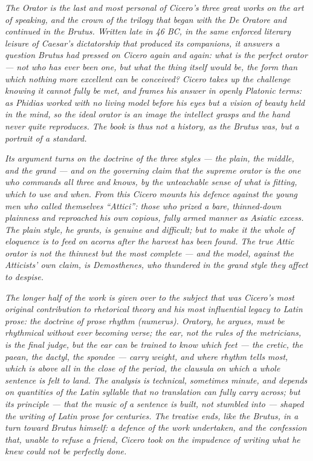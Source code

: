 
\textit{The \textit{Orator} is the last and most personal of
Cicero's three great works on the art of speaking, and the
crown of the trilogy that began with the \textit{De Oratore}
and continued in the \textit{Brutus}. Written late in 46 BC,
in the same enforced literary leisure of Caesar's dictatorship
that produced its companions, it answers a question Brutus had
pressed on Cicero again and again: what is the perfect orator
--- not who has ever been one, but what the thing itself would
be, the form than which nothing more excellent can be conceived?
Cicero takes up the challenge knowing it cannot fully be met,
and frames his answer in openly Platonic terms: as Phidias
worked with no living model before his eyes but a vision of
beauty held in the mind, so the ideal orator is an image the
intellect grasps and the hand never quite reproduces. The book
is thus not a history, as the \textit{Brutus} was, but a
portrait of a standard.}

\textit{Its argument turns on the doctrine of the three styles
--- the plain, the middle, and the grand --- and on the
governing claim that the supreme orator is the one who commands
all three and knows, by the unteachable sense of what is
fitting, which to use and when. From this Cicero mounts his
defence against the young men who called themselves
``Attici'': those who prized a bare, thinned-down plainness and
reproached his own copious, fully armed manner as Asiatic
excess. The plain style, he grants, is genuine and difficult;
but to make it the whole of eloquence is to feed on acorns
after the harvest has been found. The true Attic orator is not
the thinnest but the most complete --- and the model, against
the Atticists' own claim, is Demosthenes, who thundered in the
grand style they affect to despise.}

\textit{The longer half of the work is given over to the
subject that was Cicero's most original contribution to
rhetorical theory and his most influential legacy to Latin
prose: the doctrine of prose rhythm (\textit{numerus}).
Oratory, he argues, must be rhythmical without ever becoming
verse; the ear, not the rules of the metricians, is the final
judge, but the ear can be trained to know which feet --- the
cretic, the paean, the dactyl, the spondee --- carry weight,
and where rhythm tells most, which is above all in the close of
the period, the clausula on which a whole sentence is felt to
land. The analysis is technical, sometimes minute, and depends
on quantities of the Latin syllable that no translation can
fully carry across; but its principle --- that the music of a
sentence is built, not stumbled into --- shaped the writing of
Latin prose for centuries. The treatise ends, like the
\textit{Brutus}, in a turn toward Brutus himself: a defence of
the work undertaken, and the confession that, unable to refuse
a friend, Cicero took on the impudence of writing what he knew
could not be perfectly done.}
